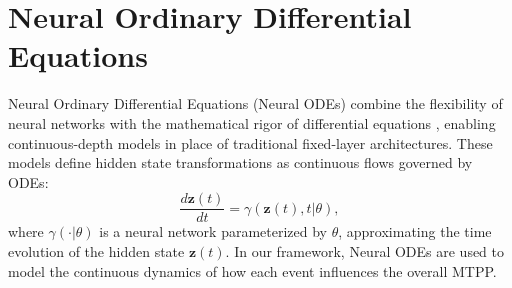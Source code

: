 \section{Neural Ordinary Differential Equations}
Neural Ordinary Differential Equations (Neural ODEs) combine the flexibility of neural networks with the mathematical rigor of differential equations \cite{bib:node}, enabling continuous-depth models in place of traditional fixed-layer architectures. 
These models define hidden state transformations as continuous flows governed by ODEs:
\begin{equation}
\frac{{d\mathbf{z}(t)}}{{dt}} = \gamma(\mathbf{z}(t), t| \theta),
\end{equation}
where $\gamma(\cdot|\theta)$ is a neural network parameterized by $\theta$, approximating the time evolution of the hidden state $\mathbf{z}(t)$. In our framework, Neural ODEs are used to model the continuous dynamics of how each event influences the overall MTPP.
